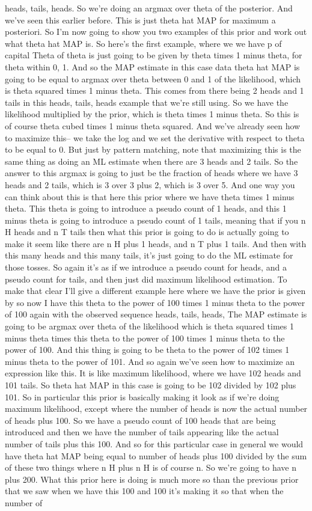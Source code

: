 \documentclass[6008notes.tex]{subfiles}
\begin{document}
heads, tails, heads. So we're doing an argmax over theta of the posterior. And we've seen this earlier before. This is just theta hat MAP for maximum a posteriori. So I'm now going to show you two examples of this prior and work out what theta hat MAP is. So here's the first example, where we we have p of capital Theta of theta is just going to be given by theta times 1 minus theta, for theta within 0, 1. And so the MAP estimate in this case data theta hat MAP is going to be equal to argmax over theta between 0 and 1 of the likelihood, which is theta squared times 1 minus theta. This comes from there being 2 heads and 1 tails in this heads, tails, heads example that we're still using. So we have the likelihood multiplied by the prior, which is theta times 1 minus theta. So this is of course theta cubed times 1 minus theta squared. And we've already seen how to maximize this-- we take the log and we set the derivative with respect to theta to be equal to 0. But just by pattern matching, note that maximizing this is the same thing as doing an ML estimate when there are 3 heads and 2 tails. So the answer to this argmax is going to just be the fraction of heads where we have 3 heads and 2 tails, which is 3 over 3 plus 2, which is 3 over 5. And one way you can think about this is that here this prior where we have theta times 1 minus theta. This theta is going to introduce a pseudo count of 1 heads, and this 1 minus theta is going to introduce a pseudo count of 1 tails, meaning that if you n H heads and n T tails then what this prior is going to do is actually going to make it seem like there are n H plus 1 heads, and n T plus 1 tails. And then with this many heads and this many tails, it's just going to do the ML estimate for those tosses. So again it's as if we introduce a pseudo count for heads, and a pseudo count for tails, and then just did maximum likelihood estimation. To make that clear I'll give a different example here where we have the prior is given by so now I have this theta to the power of 100 times 1 minus theta to the power of 100 again with the observed sequence heads, tails, heads, The MAP estimate is going to be argmax over theta of the likelihood which is theta squared times 1 minus theta times this theta to the power of 100 times 1 minus theta to the power of 100. And this thing is going to be theta to the power of 102 times 1 minus theta to the power of 101. And so again we've seen how to maximize an expression like this. It is like maximum likelihood, where we have 102 heads and 101 tails. So theta hat MAP in this case is going to be 102 divided by 102 plus 101. So in particular this prior is basically making it look as if we're doing maximum likelihood, except where the number of heads is now the actual number of heads plus 100. So we have a pseudo count of 100 heads that are being introduced and then we have the number of tails appearing like the actual number of tails plus this 100. And so for this particular case in general we would have theta hat MAP being equal to number of heads plus 100 divided by the sum of these two things where n H plus n H is of course n. So we're going to have n plus 200. What this prior here is doing is much more so than the previous prior that we saw when we have this 100 and 100 it's making it so that when the number of 
\end{document}

